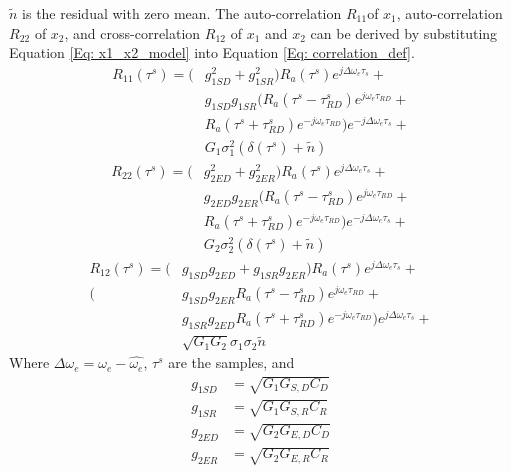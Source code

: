 \documentclass[draftcls]{IEEEtran}
\begin{document}
$\tilde{n}$ is the residual with zero mean. The auto-correlation $R_{11}$of $x_1$, auto-correlation $R_{22}$ of $x_2$, and cross-correlation $R_{12}$ of $x_1$ and $x_2$ can be derived by substituting Equation \ref{Eq: x1_x2_model} into Equation \ref{Eq: correlation_def}.
\begin{equation}
\begin{split}
	R_{11}(\tau^s) = (&g^2_{1SD} + g^2_{1SR})R_a(\tau^s)e^{j\Delta\omega_e\tau_s}+\\
    								 & g_{1SD} g_{1SR} (R_a(\tau^s-\tau^s_{RD})e^{j\omega_e \tau_{RD}}+\\ &R_a(\tau^s+\tau^s_{RD})e^{-j\omega_e \tau_{RD}})e^{-j\Delta\omega_e\tau_s}+\\
&G_1\sigma^2_1(\delta(\tau^s) + \tilde{n})                                     
\end{split}
\label{Eq: R11}
\end{equation}
\begin{equation}
\begin{split}
	R_{22}(\tau^s) = (&g^2_{2ED} + g^2_{2ER})R_a(\tau^s)e^{j\Delta\omega_e\tau_s}+\\
    								 & g_{2ED} g_{2ER} (R_a(\tau^s-\tau^s_{RD})e^{j\omega_e \tau_{RD}}+\\ &R_a(\tau^s+\tau^s_{RD})e^{-j\omega_e \tau_{RD}})e^{-j\Delta\omega_e\tau_s}+\\
&G_2\sigma^2_2(\delta(\tau^s) + \tilde{n})                                     
\end{split}
\label{Eq: R22}
\end{equation}
\begin{equation}
\begin{split}
	R_{12}(\tau^s) = (&g_{1SD} g_{2ED} + g_{1SR} g_{2ER})R_a(\tau^s)e^{j\Delta\omega_e\tau_s}+\\
    								 (& g_{1SD} g_{2ER} R_a(\tau^s-\tau^s_{RD})e^{j\omega_e \tau_{RD}}+\\ &g_{1SR} g_{2ED} R_a(\tau^s+\tau^s_{RD})e^{-j\omega_e \tau_{RD}})e^{j\Delta\omega_e\tau_s}+\\
&\sqrt{G_1 G_2}\sigma_1 \sigma_2 \tilde{n}                                     
\end{split}
\label{Eq: R12}
\end{equation}Where $\Delta \omega_e = \omega_e - \hat{\omega_e}$, $\tau^s$ are the samples, and 
\begin{eqnarray}
	g_{1SD} &= \sqrt{G_1 G_{S,D} C_D} \\
    g_{1SR} &= \sqrt{G_1 G_{S,R} C_R} \\
    g_{2ED} &= \sqrt{G_2 G_{E,D} C_D} \\
    g_{2ER} &= \sqrt{G_2 G_{E,R} C_R} \label{Eq:total gain}
\end{eqnarray}
\end{document}
